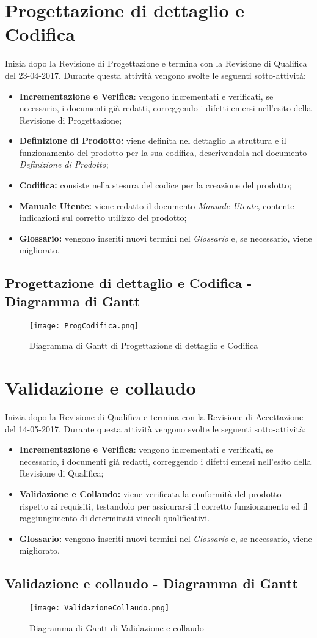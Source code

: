 \documentclass[../PianodiProgetto.tex]{subfiles}
\begin{document}
	\section{Progettazione di dettaglio e Codifica}
	Inizia dopo la Revisione di Progettazione e termina con la Revisione di Qualifica del 23-04-2017. Durante questa attività vengono svolte le seguenti sotto-attività:
	\begin{itemize}
		\item \textbf{Incrementazione e Verifica}: vengono incrementati e verificati, se necessario, i documenti già redatti, correggendo i difetti emersi nell'esito della Revisione di Progettazione;	
		\item \textbf{Definizione di Prodotto:} viene definita nel dettaglio la struttura e il funzionamento del prodotto per la sua codifica, descrivendola nel documento \textit{Definizione di Prodotto};
		\item \textbf{Codifica:} consiste nella stesura del codice per la creazione del prodotto;
		\item \textbf{Manuale Utente:} viene redatto il documento \textit{Manuale Utente}, contente indicazioni sul corretto utilizzo del prodotto; 
		\item \textbf{Glossario:} vengono inseriti nuovi termini nel \textit{Glossario} e, se necessario, viene migliorato.
	\end{itemize}
	\subsection{Progettazione di dettaglio e Codifica - Diagramma di Gantt}
	\begin{figure}[H]
		\texttt{[image: ProgCodifica.png]}	
		\caption{Diagramma di Gantt di Progettazione di dettaglio e Codifica}\label{fig:4}	
	\end{figure}
	
	\section{Validazione e collaudo}
	Inizia dopo la Revisione di Qualifica e termina con la Revisione di Accettazione del 14-05-2017. Durante questa attività vengono svolte le seguenti sotto-attività:
	\begin{itemize}
		\item \textbf{Incrementazione e Verifica}: vengono incrementati e verificati, se necessario, i documenti già redatti, correggendo i difetti emersi nell'esito della Revisione di Qualifica;		
		\item \textbf{Validazione e Collaudo:} viene verificata la conformità del prodotto rispetto ai requisiti, testandolo per assicurarsi il corretto funzionamento ed il raggiungimento di determinati vincoli qualificativi.
		\item \textbf{Glossario:} vengono inseriti nuovi termini nel \textit{Glossario} e, se necessario, viene migliorato.
	\end{itemize}
	\subsection{Validazione e collaudo - Diagramma di Gantt}
	\begin{figure}[H]
		\texttt{[image: ValidazioneCollaudo.png]}	
		\caption{Diagramma di Gantt di Validazione e collaudo}\label{fig:5}	
	\end{figure}
\end{document}
